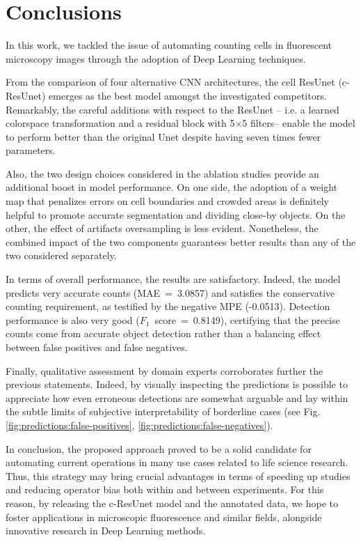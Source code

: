 \chapter{Conclusions}
\label{chap:partI_conclusions}
In this work, we tackled the issue of automating counting cells in fluorescent microscopy images through the adoption of Deep Learning techniques.

From the comparison of four alternative CNN architectures, the cell ResUnet (c-ResUnet) emerges as the best model amongst the investigated competitors.
Remarkably, the careful additions with respect to the ResUnet \cite{deep_resunet} -- i.e. a learned colorspace transformation and a residual block with 5$\times$5 filters-- enable the model to perform better than the original Unet \cite{unet} despite having seven times fewer parameters.

Also, the two design choices considered in the ablation studies provide an additional boost in model performance. 
On one side, the adoption of a weight map that penalizes errors on cell boundaries and crowded areas is definitely helpful to promote accurate segmentation and dividing close-by objects. 
On the other, the effect of artifacts oversampling is less evident.
Nonetheless, the combined impact of the two components guarantees better results than any of the two considered separately.

In terms of overall performance, the results are satisfactory. 
Indeed, the model predicts very accurate counts (\mbox{MAE = 3.0857}) and satisfies the conservative counting requirement, as testified by the negative MPE (-0.0513).
Detection performance is also very good (\mbox{$F_1$ score = 0.8149}), certifying that the precise counts come from accurate object detection rather than a balancing effect between false positives and false negatives.

Finally, qualitative assessment by domain experts corroborates further the previous statements. 
Indeed, by visually inspecting the predictions is possible to appreciate how even erroneous detections are somewhat arguable and lay within the subtle limits of subjective interpretability of borderline cases (see Fig. \ref{fig:predictions:false-positives}, \ref{fig:predictions:false-negatives}).


In conclusion, the proposed approach proved to be a solid candidate for automating current operations in many use cases related to life science research.
Thus, this strategy may bring crucial advantages in terms of speeding up studies and reducing operator bias both within and between experiments.
For this reason, by releasing the c-ResUnet model and the annotated data, we hope to foster applications in microscopic fluorescence and similar fields, alongside innovative research in Deep Learning methods.